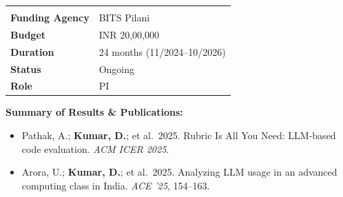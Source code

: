 \documentclass[10pt, a4paper]{article}
\begin{document}

\vspace{0.8em}

\renewcommand{\arraystretch}{1.35}
\begin{tabularx}{\linewidth}{L{4.0cm} X}
   \\
  \textbf{Funding Agency}      & BITS Pilani \\
  \textbf{Budget}              & INR 20,00,000 \\
  \textbf{Duration}            & 24 months (11/2024--10/2026) \\
  \textbf{Status}              & \textcolor{AwardRed}{Ongoing} \\
  \textbf{Role}                & PI \\
\end{tabularx}

\vspace{0.3em}
\textbf{\color{AccentBlue}Summary of Results \& Publications:}
\begin{itemize}
  \item Pathak, A.; \textbf{Kumar, D.}; et al.\ 2025. Rubric Is All You Need: LLM-based code evaluation. \textit{ACM ICER 2025}.
  \item Arora, U.; \textbf{Kumar, D.}; et al.\ 2025. Analyzing LLM usage in an advanced computing class in India. \textit{ACE '25}, 154--163.
\end{itemize}

\vspace{0.8em}
\end{document}
